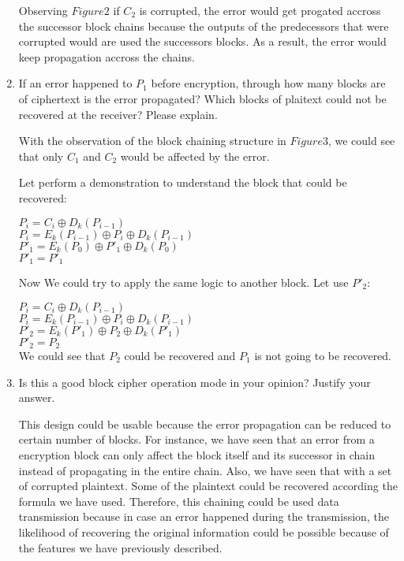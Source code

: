 \documentclass[12]{article}
\begin{document}
\begin{enumerate}
	
	 Observing $Figure2$ if $C_2$ is corrupted, the error would get progated accross  the successor block chains because the outputs of the predecessors that were corrupted would are used the successors blocks. As a result, the error would keep propagation accross the chains.
	 
	 \item If an error happened to $P_1$ before encryption, through how many blocks are of ciphertext is the error propagated? Which blocks of plaitext could not be recovered at the receiver? Please explain. 
	 
	 With the observation of the block chaining structure in $Figure3$, we could see that only $C_1$ and $C_2$ would be affected by the error. 
	 
	  Let perform a demonstration to understand the block that could be recovered:
	  
	  $P_i = C_i  \oplus D_k(P_{ i - 1 })$ \\
	  $P_i = E_k(P_{i - 1}) \oplus P_i  \oplus D_k(P_{ i - 1 }) $ \\
	  $P'_1 = E_k(P_0)  \oplus P'_1 \oplus D_k(P_0)$ \\
	  $P'_1 = P'_1$
	  
	  Now We could try to apply the same logic to another block. Let use $P'_2$:
	   
	  $P_i = C_i  \oplus D_k(P_{ i - 1 })$ \\
	  $P_i = E_k(P_{i - 1}) \oplus P_i  \oplus D_k(P_{ i - 1 }) $ \\
	  $P'_2 = E_k(P'_1)  \oplus P_2 \oplus D_k(P'_1)$ 
	  \\
	  $P'_2 =  P_2$ \\
	  
	  We could see that  $P_2$ could be recovered and $P_1$ is not going to be recovered.
	  
	 
	 
	 \item  Is this a good block cipher operation mode in your opinion? Justify your answer. 
	 
	  This design could be usable because the error propagation can be reduced to certain
number of blocks. For instance, we have seen that an error from a encryption block can
only affect the block itself and its successor in chain instead of propagating in the entire
chain. Also, we have seen that with a set of corrupted plaintext. Some of the
plaintext could be recovered according the formula we have used. Therefore, this
chaining could be used data transmission because in case an error happened during
the transmission, the likelihood of recovering the original information could be possible
because of the features we have previously described.
	 
	 
\end{enumerate}
	
\end{document}
